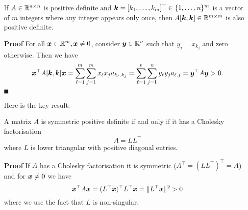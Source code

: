 \begin{lemma} If $A \in {\mathbb R}^{n \times n}$ is positive definite and $\bm{{\mbox{\boldmath$k$\unboldmath}}} = [k_1,\ldots,k_m]^\top \in \{1,\ldots,n\}^m$ is a vector of $m$ integers where any integer appears only once,  then $A[\bm{{\mbox{\boldmath$k$\unboldmath}}},\bm{{\mbox{\boldmath$k$\unboldmath}}}] \in {\mathbb R}^{m \times m}$ is also positive definite. \end{lemma}
\textbf{Proof} For all $\bm{{\mbox{\boldmath$x$\unboldmath}}} \in {\mathbb R}^m, \bm{{\mbox{\boldmath$x$\unboldmath}}} \neq 0$, consider $\bm{{\mbox{\boldmath$y$\unboldmath}}} \in {\mathbb R}^n$ such that $y_j = x_{k_j}$ and zero otherwise. Then we have
\[
\bm{{\mbox{\boldmath$x$\unboldmath}}}^\top A[\bm{{\mbox{\boldmath$k$\unboldmath}}},\bm{{\mbox{\boldmath$k$\unboldmath}}}] \bm{{\mbox{\boldmath$x$\unboldmath}}} = \sum_{\ell=1}^m \sum_{j=1}^m x_\ell x_j a_{k_\ell,k_j}  = \sum_{\ell=1}^n \sum_{j=1}^n y_\ell y_j a_{\ell,j} = \bm{{\mbox{\boldmath$y$\unboldmath}}}^\top A \bm{{\mbox{\boldmath$y$\unboldmath}}} > 0.
\]
\ensuremath{\QED}

Here is the key result:

\begin{theorem} A matrix $A$ is symmetric positive definite if and only if it has a Cholesky factorisation
\[
A = L L^\ensuremath{\top}
\]
where $L$ is lower triangular with positive diagonal entries.

\end{theorem}
\textbf{Proof} If $A$ has a Cholesky factorisation it is symmetric ($A^\ensuremath{\top} = (L L^\ensuremath{\top})^\ensuremath{\top} = A$) and for $\bm{{\mbox{\boldmath$x$\unboldmath}}} \neq 0$ we have
\[
\bm{{\mbox{\boldmath$x$\unboldmath}}}^\top A \bm{{\mbox{\boldmath$x$\unboldmath}}} = (L^\top\bm{{\mbox{\boldmath$x$\unboldmath}}})^\top L^\top \bm{{\mbox{\boldmath$x$\unboldmath}}} = \|L^\top\bm{{\mbox{\boldmath$x$\unboldmath}}}\|^2 > 0
\]
where we use the fact that $L$ is non-singular.

